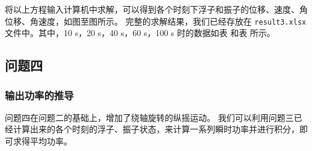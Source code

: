 将以上方程输入计算机中求解，可以得到各个时刻下浮子和振子的位移、速度、角位移、角速度，如图至图所示。
完整的求解结果，我们已经存放在 \verb|result3.xlsx|文件中。其中，10 s，20 s，40 s，60 s，100 s 时的数据如表 和表 所示。

\subsection{问题四}

\subsubsection{输出功率的推导}

问题四在问题二的基础上，增加了绕轴旋转的纵摇运动。
我们可以利用问题三已经计算出来的各个时刻的浮子、振子状态，来计算一系列瞬时功率并进行积分，即可求得平均功率。
